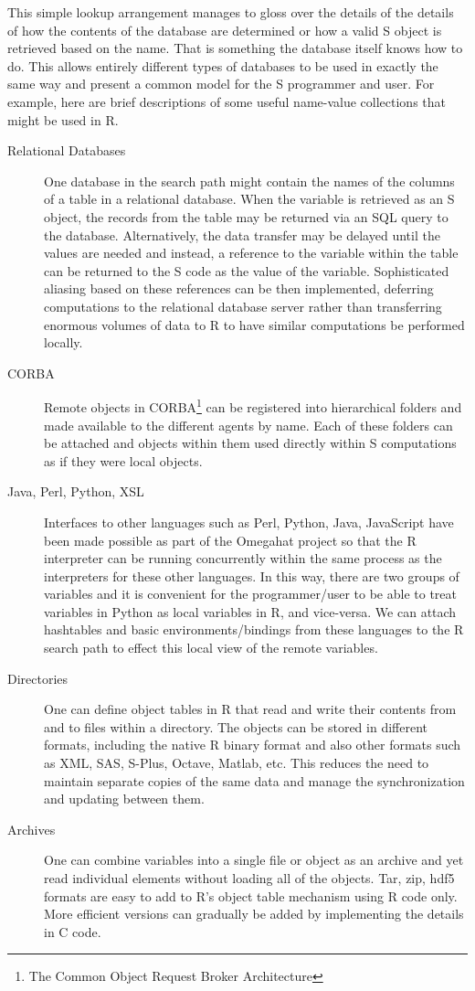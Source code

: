 \documentclass{article}
\begin{document}
This simple lookup arrangement manages to gloss over the details of
the details of how the contents of the database are determined or how
a valid S object is retrieved based on the name. That is something the
database itself knows how to do. This allows entirely different types
of databases to be used in exactly the same way and present a common
model for the S programmer and user.
For example, here are brief descriptions of some useful 
name-value collections that might be used in R.
\begin{description}
\item[Relational Databases] One database in the search path might
  contain the names of the columns of a table in a relational
  database. When the variable is retrieved as an S object, the records
  from the table may be returned via an SQL query to the database.
  Alternatively, the data transfer may be delayed until the values are
  needed and instead, a reference to the variable within the table can
  be returned to the S code as the value of the variable.
  Sophisticated aliasing based on these references can be then
  implemented, deferring computations to the relational database
  server rather than transferring enormous volumes of data to R to
  have similar computations be performed locally.

\item[CORBA] Remote objects in CORBA\footnote{The Common Object
    Request Broker Architecture} can be registered into hierarchical
  folders and made available to the different agents by name.
  Each of these folders can be attached and objects within them
  used directly within S computations as if they were local objects.

\item[Java, Perl, Python, XSL] Interfaces to other languages such as
  Perl, Python, Java, JavaScript have been made possible as part of
  the Omegahat project so that the R interpreter can be running
  concurrently within the same process as the interpreters for these
  other languages.  In this way, there are two groups of variables and
  it is convenient for the programmer/user to be able to treat
  variables in Python as local variables in R, and vice-versa. We can
  attach hashtables and basic environments/bindings from these
  languages to the R search path to effect this local view of the
  remote variables.
\item[Directories] One can define object tables in R that read and
  write their contents from and to files within a directory. The
  objects can be stored in different formats, including the native R
  binary format and also other formats such as XML, SAS, S-Plus,
  Octave, Matlab, etc.  This reduces the need to maintain separate
  copies of the same data and manage the synchronization and updating
  between them.
\item[Archives]
 One can combine variables into a single file or object
 as an archive and yet read individual elements without loading
 all of the objects. Tar, zip, hdf5 formats are easy to add to R's
 object table mechanism using R code only. More efficient versions
 can gradually be added by implementing the details in C code.
 

\end{description}
\end{document}
